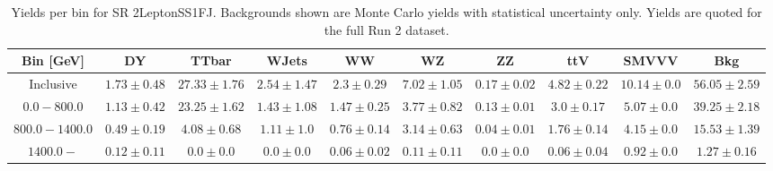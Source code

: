 \begin{table}[!htbp]
    \small
    \center
    \begin{tabular}{c|c|c|c|c|c|c|c|c||c}
    Bin [GeV] & DY & TTbar & WJets & WW & WZ & ZZ & ttV & SMVVV & Bkg\\
    \hline
    Inclusive & $1.73 \pm 0.48$ & $27.33 \pm 1.76$ & $2.54 \pm 1.47$ & $2.3 \pm 0.29$ & $7.02 \pm 1.05$ & $0.17 \pm 0.02$ & $4.82 \pm 0.22$ & $10.14 \pm 0.0$ & $56.05 \pm 2.59$\\
    \hline
    $0.0-800.0$ & $1.13 \pm 0.42$ & $23.25 \pm 1.62$ & $1.43 \pm 1.08$ & $1.47 \pm 0.25$ & $3.77 \pm 0.82$ & $0.13 \pm 0.01$ & $3.0 \pm 0.17$ & $5.07 \pm 0.0$ & $39.25 \pm 2.18$\\
    \hline
    $800.0-1400.0$ & $0.49 \pm 0.19$ & $4.08 \pm 0.68$ & $1.11 \pm 1.0$ & $0.76 \pm 0.14$ & $3.14 \pm 0.63$ & $0.04 \pm 0.01$ & $1.76 \pm 0.14$ & $4.15 \pm 0.0$ & $15.53 \pm 1.39$\\
    \hline
    $1400.0-$ & $0.12 \pm 0.11$ & $0.0 \pm 0.0$ & $0.0 \pm 0.0$ & $0.06 \pm 0.02$ & $0.11 \pm 0.11$ & $0.0 \pm 0.0$ & $0.06 \pm 0.04$ & $0.92 \pm 0.0$ & $1.27 \pm 0.16$\\
\end{tabular}
    \caption{Yields per bin for SR 2LeptonSS1FJ. Backgrounds shown are Monte Carlo yields with statistical uncertainty only. Yields are quoted for the full Run 2 dataset.}
    \label{tab:2LeptonSS1FJ$bins}
\end{table}
